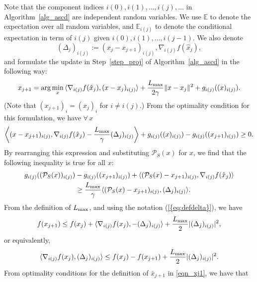 \documentclass{siamltex}
\begin{document}
Note that the component indices $i(0), i(1),\dotsc,i(j), \dotsc$ in
Algorithm~\ref{alg_ascd} are independent random variables. We use ${\mathbb{E}}$
to denote the expectation over all random variables, and ${\mathbb{E}}_{i(j)}$
to denote the conditional expectation in term of $i(j)$ given $i(0),
i(1), \dotsc, i(j-1)$.  We also denote \begin{equation}\label{eq:defdelta}
(\Delta_j)_{i(j)}:=(x_j-x_{j+1})_{i(j)},
\nabla_{i(j)} f({\hat{x}}_{j}), \end{equation}
and formulate the update in Step~\ref{step_proj} of
Algorithm~\ref{alg_ascd} in the following way:
\[
x_{j+1}=\arg\min_{x} \, \langle \nabla_{i(j)}f({\hat{x}}_{j}), (x-x_j)_{i(j)} \rangle + \frac{L_{\mbox{\rm\scriptsize max}}}{2\gamma}\|x-x_j\|^2+ g_{i(j)}((x)_{i(j)}).
\]
(Note that $(x_{j+1})_i=(x_j)_i$ for $i\neq i(j)$.) From the optimality condition for this formulation, we have \mbox{\rm $\forall \, x$}
\begin{align*}
\left\langle (x-x_{j+1})_{i(j)}, \nabla_{i(j)}f({\hat{x}}_{j}) - {{L_{\mbox{\rm\scriptsize max}}}\over \gamma}(\Delta_j)_{i(j)} \right\rangle + g_{i(j)}((x)_{i(j)}) - g_{i(j)}((x_{j+1})_{i(j)}) \geq 0.
\end{align*}
By rearranging this expression and substituting ${\mathcal{P}_{S}}(x)$ for $x$, we
find that the following inequality is true for all $x$:
\begin{align}
\nonumber
  g_{i(j)}(({\mathcal{P}_{S}}(x))_{i(j)}) & - g_{i(j)}((x_{j+1})_{i(j)}) + \langle
  ({\mathcal{P}_{S}}(x)-x_{j+1})_{i(j)}, \nabla_{i(j)} f({\hat{x}}_{j}) \rangle \\
& \geq
  \frac{L_{\mbox{\rm\scriptsize max}}}{\gamma}\langle ({\mathcal{P}_{S}}(x)-x_{j+1})_{i(j)},
  (\Delta_j)_{i(j)} \rangle.
\label{eqn_pre_1}
\end{align}
From the definition of ${L_{\mbox{\rm\scriptsize max}}}$, and using the notation
{(\ref{{eq:defdelta}})}, we have
\begin{align*}
f(x_{j+1}) \leq f(x_j) + \langle \nabla_{i(j)}f(x_j), -(\Delta_j)_{i(j)} \rangle + {{L_{\mbox{\rm\scriptsize max}}}\over 2}|(\Delta_j)_{i(j)}|^2,
\end{align*}
or equivalently,
\begin{align}
\langle \nabla_{i(j)}f(x_j), (\Delta_j)_{i(j)} \rangle \leq f(x_j) - f(x_{j+1})  + {{L_{\mbox{\rm\scriptsize max}}}\over 2}|(\Delta_j)_{i(j)}|^2.
\label{eqn_pre_2}
\end{align}
From optimality conditions for the definition of $\bar{x}_{j+1}$ in
\eqref{eqn_xj1}, we have that
\end{document}
